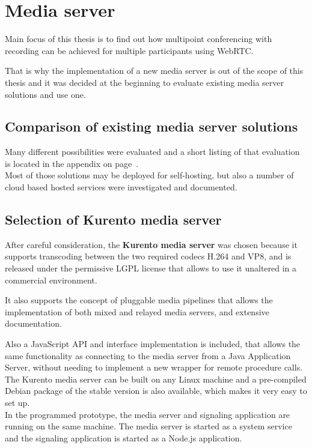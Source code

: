 \documentclass[../../../thesis.tex]{subfiles}
\begin{document}
\section{Media server}
Main focus of this thesis is to find out how multipoint conferencing with recording can be achieved for multiple participants using WebRTC.

That is why the implementation of a new media server is out of the scope of this thesis and it was decided at the beginning to evaluate existing media server solutions and use one.

\subsection{Comparison of existing media server solutions}
Many different possibilities were evaluated and a short listing of that evaluation is located in the appendix on page~\pageref{chap:compare-media-servers}.\\
Most of those solutions may be deployed for self-hosting, but also a number of cloud based hosted services were investigated and documented.

\subsection{Selection of Kurento media server}
After careful consideration, the \textbf{Kurento media server}\cite{kurento} was chosen because it supports transcoding between the two required codecs H.264 and VP8\cite{ietf-rtcweb-video}, and is released under the permissive LGPL license that allows to use it unaltered in a commercial environment.\par
It also supports the concept of pluggable media pipelines that allows the implementation of both mixed and relayed media servers\footnotemark, and extensive documentation.
\par
Also a JavaScript API and interface implementation is included, that allows the same functionality as connecting to the media server from a Java Application Server, without needing to implement a new wrapper for remote procedure calls.\\

The Kurento media server can be built on any Linux machine and a pre-compiled Debian package of the stable version is also available, which makes it very easy to set up.\\

In the programmed prototype, the media server and signaling application are running on the same machine. The media server is started as a system service and the signaling application is started as a Node.js application.
\end{document}
